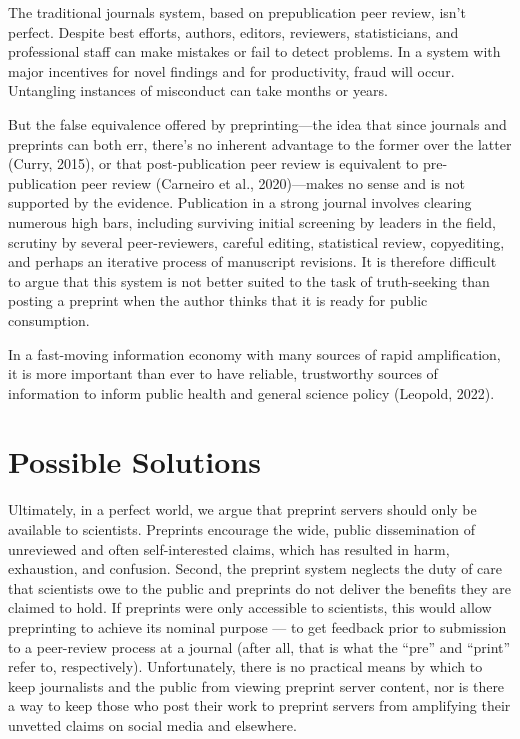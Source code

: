 \documentclass[authordate, perspective, issue]{jote-new-article}
\begin{document}
	The traditional journals system, based on prepublication peer review, isn't perfect. Despite best efforts, authors, editors, reviewers, statisticians, and professional staff can make mistakes or fail to detect problems. In a system with major incentives for novel findings and for productivity, fraud will occur. Untangling instances of misconduct can take months or years.







	But the false equivalence offered by preprinting—the idea that since journals and preprints can both err, there's no inherent advantage to the former over the latter (Curry, 2015), or that post-publication peer review is equivalent to pre-publication peer review (Carneiro et al., 2020)—makes no sense and is not supported by the evidence. Publication in a strong journal involves clearing numerous high bars, including surviving initial screening by leaders in the field, scrutiny by several peer-reviewers, careful editing, statistical review, copyediting, and perhaps an iterative process of manuscript revisions. It is therefore difficult to argue that this system is not better suited to the task of truth-seeking than posting a preprint when the author thinks that it is ready for public consumption.







	In a fast-moving information economy with many sources of rapid amplification, it is more important than ever to have reliable, trustworthy sources of information to inform public health and general science policy (Leopold, 2022).







	\section{Possible Solutions}







	Ultimately, in a perfect world, we argue that preprint servers should only be available to scientists. Preprints encourage the wide, public dissemination of unreviewed and often self-interested claims, which has resulted in harm, exhaustion, and confusion. Second, the preprint system neglects the duty of care that scientists owe to the public and preprints do not deliver the benefits they are claimed to hold. If preprints were only accessible to scientists, this would allow preprinting to achieve its nominal purpose — to get feedback prior to submission to a peer-review process at a journal (after all, that is what the “pre” and “print” refer to, respectively). Unfortunately, there is no practical means by which to keep journalists and the public from viewing preprint server content, nor is there a way to keep those who post their work to preprint servers from amplifying their unvetted claims on social media and elsewhere.
\end{document}
